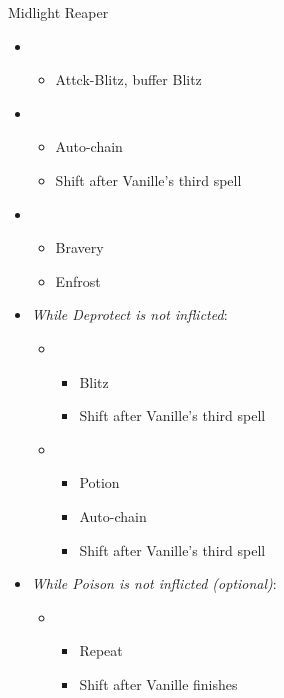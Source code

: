 \begin{paracol}{2}
	\switchcolumn*
	\begin{battle}{Midlight Reaper}
		\begin{itemize}
			\item \first
			      \begin{itemize}
				      \item Attck-Blitz, buffer Blitz
			      \end{itemize}
			\item \fifth
			      \begin{itemize}
				      \item Auto-chain
				      \item Shift after Vanille's third spell
			      \end{itemize}
			\item \third
			      \begin{itemize}
				      \item Bravery
				      \item Enfrost
			      \end{itemize}
			\item \textit{While Deprotect is not inflicted}:
			      \begin{itemize}
				      \item \sixth
				            \begin{itemize}
					            \item Blitz
					            \item Shift after Vanille's third spell
				            \end{itemize}
				      \item \fifth
				            \begin{itemize}
					            \item Potion
					            \item Auto-chain
					            \item Shift after Vanille's third spell
				            \end{itemize}
			      \end{itemize}
			\item \textit{While Poison is not inflicted (optional)}:
			      \begin{itemize}
				      \item \first
				            \begin{itemize}
					            \item Repeat
					            \item Shift after Vanille finishes

\end{itemize}
\end{itemize}
\end{itemize}
\end{battle}
\end{paracol}
